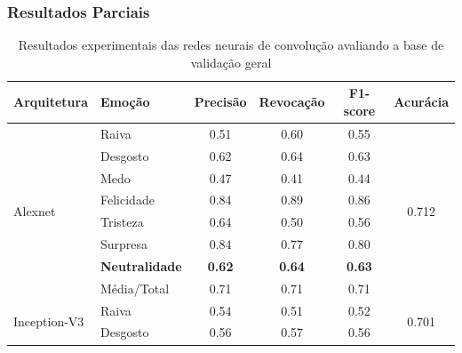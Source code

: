 \documentclass{beamer}
\begin{document}
\begin{frame}
 \frametitle{Resultados Parciais}
\begin{table}[]
\tiny
\centering
\caption{Resultados experimentais das redes neurais de convolução avaliando a base de validação geral}
\label{table:resultsexp}
\begin{tabular}{llcccc}
\hline
\textbf{Arquitetura}                & \textbf{Emoção}       & \textbf{Precisão} & \textbf{Revocação} & \textbf{F1-score} & \textbf{Acurácia}               \\ \hline
\multirow{8}{*}{Alexnet}            & Raiva                 & 0.51              & 0.60               & 0.55              & \multirow{8}{*}{0.712}          \\
                                    & Desgosto              & 0.62              & 0.64               & 0.63              &                                 \\
                                    & Medo                  & 0.47              & 0.41               & 0.44              &                                 \\
                                    & Felicidade            & 0.84              & 0.89               & 0.86              &                                 \\
                                    & Tristeza              & 0.64              & 0.50               & 0.56              &                                 \\
                                    & Surpresa              & 0.84              & 0.77               & 0.80              &                                 \\
                                    & \scriptsize \textbf{Neutralidade}          & \scriptsize \textbf{0.62}              & \scriptsize \textbf{0.64}               & \scriptsize \textbf{0.63}              &                                 \\
                                    & Média/Total           & 0.71              & 0.71               & 0.71              &                                 \\ \hline
\multirow{8}{*}{Inception-V3}       & Raiva                 & 0.54              & 0.51               & 0.52              & \multirow{8}{*}{0.701}          \\
                                    & Desgosto              & 0.56              & 0.57               & 0.56              &                                 \\

\end{tabular}
\end{table}
\end{frame}
\end{document}
